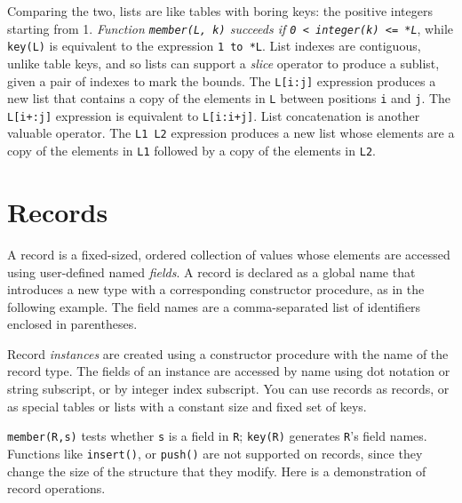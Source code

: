 Comparing the two, lists are like tables with boring keys: the
positive integers starting from 1. {\em Function \texttt{member(L, k)}
succeeds if \texttt{0 {\textless} integer(k) {\textless}= *L}\/}, while
\texttt{key(L)} is equivalent to the expression \texttt{1 to *L}. List
indexes are contiguous, unlike table keys, and so lists can support a
\textit{slice} operator to produce a sublist,
given a pair of indexes to mark the bounds. The \texttt{L[i:j]}
expression produces a new list that contains a copy of the elements in
\texttt{L} between positions \texttt{i} and \texttt{j}. The
\texttt{L[i+:j]} expression is equivalent to \texttt{L[i:i+j]}. List
concatenation is another valuable operator. The \texttt{L1
{\textbar}{\textbar}{\textbar} L2} expression produces a new list whose
elements are a copy of the elements in \texttt{L1} followed by a copy
of the elements in \texttt{L2}.

\section{Records}

A record is a fixed-sized, ordered collection of values
whose elements are accessed using user-defined named \textit{fields}. A
record is declared as a global name that introduces a new type with a
corresponding constructor procedure, as in
the following example. The field names are a comma-separated list of
identifiers enclosed in parentheses.


Record \textit{instances} are created using a
constructor procedure with the name of the record type. The
fields of an instance are accessed by name using dot notation or string
subscript, or by integer index subscript. You can use records as
records, or as special tables or lists with
a constant size and fixed set of keys.

\texttt{member(R,s)} tests whether \texttt{s} is a field in \texttt{R};
\texttt{key(R)} generates \texttt{R}'s field names.
Functions like \texttt{insert()}, or \texttt{push()} are not supported
on records, since they change the size of the structure that they
modify. Here is a demonstration of record operations.


